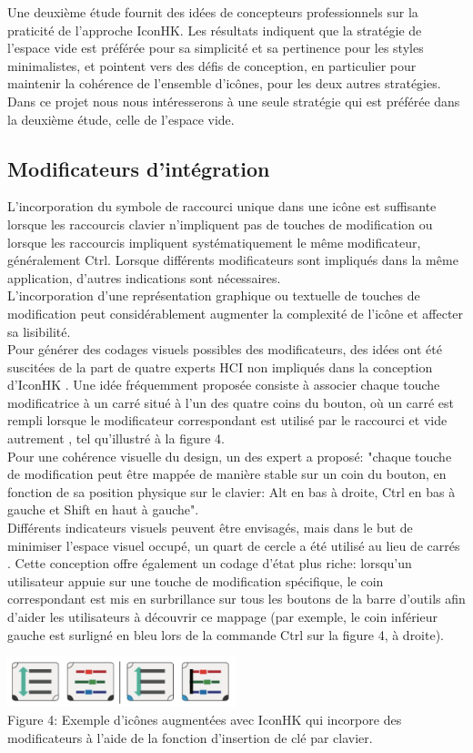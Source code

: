 \documentclass[12pt,a4paper]{article}
\newcommand\tab[1][0.65cm]{\hspace*{#1}}
\begin{document}
\tab Une deuxième étude fournit des idées de concepteurs professionnels sur la praticité de l'approche IconHK. Les résultats indiquent que la stratégie de l'espace vide est préférée pour sa simplicité et sa
pertinence pour les styles minimalistes, et pointent vers des défis de conception, en particulier pour maintenir la cohérence de l'ensemble d'icônes, pour les deux autres stratégies.\\
\tab Dans ce projet nous nous intéresserons à une seule stratégie qui est préférée dans la deuxième étude,
celle de l’espace vide.
\subsection{Modificateurs d’intégration}
L'incorporation du symbole de raccourci unique dans une icône est suffisante lorsque les raccourcis clavier n'impliquent pas de touches de modification ou lorsque les raccourcis impliquent systématiquement le même modificateur, généralement Ctrl. Lorsque différents modificateurs sont
impliqués dans la même application, d'autres indications sont nécessaires.\\
\tab L'incorporation d'une représentation graphique ou textuelle de touches de modification peut considérablement augmenter la complexité de l'icône et affecter sa lisibilité.\\
\tab Pour générer des codages visuels possibles des modificateurs, des idées ont été suscitées de la part de quatre experts HCI non impliqués dans la conception d’IconHK \cite{3}. Une idée fréquemment
proposée consiste à associer chaque touche modificatrice à un carré situé à l'un des quatre coins du bouton, où un carré est rempli lorsque le modificateur correspondant est utilisé par le raccourci et
vide autrement \cite{3}, tel qu'illustré à la figure 4.\\
\tab Pour une cohérence visuelle du design, un des expert a proposé: "chaque touche de modification peut être mappée de manière stable sur un coin du bouton, en fonction de sa position physique sur le clavier: Alt en bas à droite, Ctrl en bas à gauche et Shift en haut à gauche".\\
\tab Différents indicateurs visuels peuvent être envisagés, mais dans le but de minimiser l’espace visuel
occupé, un quart de cercle a été utilisé au lieu de carrés \cite{3}. Cette conception offre également un
codage d'état plus riche: lorsqu'un utilisateur appuie sur une touche de modification spécifique, le
coin correspondant est mis en surbrillance sur tous les boutons de la barre d’outils afin d'aider les
utilisateurs à découvrir ce mappage (par exemple, le coin inférieur gauche est surligné en bleu lors
de la commande Ctrl sur la figure 4, à droite).
\begin{center}
	\includegraphics[width=0.5\textwidth]{T4.png}\\
	Figure 4: Exemple d'icônes augmentées avec IconHK qui incorpore des modificateurs à l'aide de la
	fonction d'insertion de clé par clavier.
\end{center}
\end{document}
